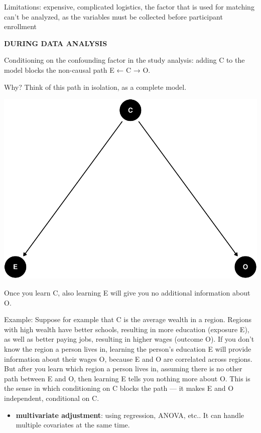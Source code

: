 \documentclass[
]{article}
\providecommand{\tightlist}{%
  \setlength{\itemsep}{0pt}\setlength{\parskip}{0pt}}
\begin{document}
Limitations: expensive, complicated logistics, the factor that is used
for matching can't be analyzed, as the variables must be collected
before participant enrollment

\textbf{DURING DATA ANALYSIS}

Conditioning on the confounding factor in the study analysis: adding C
to the model blocks the non-causal path E ← C → O.

Why? Think of this path in isolation, as a complete model.

\includegraphics{index_files/figure-latex/dag confounder condition ex1-1.pdf}

Once you learn C, also learning E will give you no additional
information about O.

Example: Suppose for example that C is the average wealth in a region.
Regions with high wealth have better schools, resulting in more
education (exposure E), as well as better paying jobs, resulting in
higher wages (outcome O). If you don't know the region a person lives
in, learning the person's education E will provide information about
their wages O, because E and O are correlated across regions. But after
you learn which region a person lives in, assuming there is no other
path between E and O, then learning E tells you nothing more about O.
This is the sense in which conditioning on C blocks the path --- it
makes E and O independent, conditional on C.

\begin{itemize}
\tightlist
\item
  \textbf{multivariate adjustment}: using regression, ANOVA, etc.. It
  can handle multiple covariates at the same time.
\end{itemize}
\end{document}
